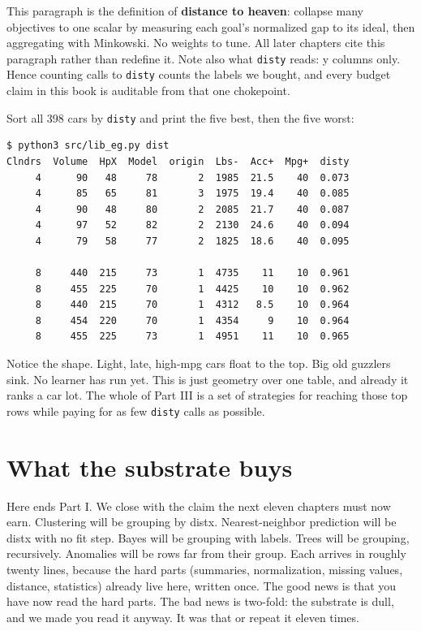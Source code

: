 \documentclass[
  justified]{tufte-book}
\begin{document}
This paragraph is the definition of \textbf{distance to heaven}:
collapse many objectives to one scalar by measuring each goal's
normalized gap to its ideal, then aggregating with Minkowski. No weights
to tune. All later chapters cite this paragraph rather than redefine it.
Note also what \texttt{disty} reads: y columns only. Hence counting
calls to \texttt{disty} counts the labels we bought, and every budget
claim in this book is auditable from that one chokepoint.

Sort all 398 cars by \texttt{disty} and print the five best, then the
five worst:

\begin{verbatim}
$ python3 src/lib_eg.py dist
Clndrs  Volume  HpX  Model  origin  Lbs-  Acc+  Mpg+  disty
     4      90   48     78       2  1985  21.5    40  0.073
     4      85   65     81       3  1975  19.4    40  0.085
     4      90   48     80       2  2085  21.7    40  0.087
     4      97   52     82       2  2130  24.6    40  0.094
     4      79   58     77       2  1825  18.6    40  0.095

     8     440  215     73       1  4735    11    10  0.961
     8     455  225     70       1  4425    10    10  0.962
     8     440  215     70       1  4312   8.5    10  0.964
     8     454  220     70       1  4354     9    10  0.964
     8     455  225     73       1  4951    11    10  0.965
\end{verbatim}

Notice the shape. Light, late, high-mpg cars float to the top. Big old
guzzlers sink. No learner has run yet. This is just geometry over one
table, and already it ranks a car lot. The whole of Part III is a set of
strategies for reaching those top rows while paying for as few
\texttt{disty} calls as possible.

\section{What the substrate buys}\label{what-the-substrate-buys}

Here ends Part I. We close with the claim the next eleven chapters must
now earn. Clustering will be grouping by distx. Nearest-neighbor
prediction will be distx with no fit step. Bayes will be grouping with
labels. Trees will be grouping, recursively. Anomalies will be rows far
from their group. Each arrives in roughly twenty lines, because the hard
parts (summaries, normalization, missing values, distance, statistics)
already live here, written once. The good news is that you have now read
the hard parts. The bad news is two-fold: the substrate is dull, and we
made you read it anyway. It was that or repeat it eleven times.
\end{document}
